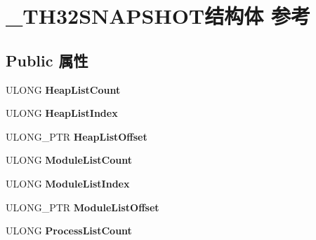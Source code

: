 \hypertarget{struct___t_h32_s_n_a_p_s_h_o_t}{}\section{\+\_\+\+T\+H32\+S\+N\+A\+P\+S\+H\+O\+T结构体 参考}
\label{struct___t_h32_s_n_a_p_s_h_o_t}
\subsection*{Public 属性}
\begin{DoxyCompactItemize}
\item 
\mbox{\label{struct___t_h32_s_n_a_p_s_h_o_t_af9a6c101b92390b093a267cd13b3f395}} 
U\+L\+O\+NG {\bfseries Heap\+List\+Count}
\item 
\mbox{\label{struct___t_h32_s_n_a_p_s_h_o_t_afd4d57ac13cd4161abc173178169b960}} 
U\+L\+O\+NG {\bfseries Heap\+List\+Index}
\item 
\mbox{\label{struct___t_h32_s_n_a_p_s_h_o_t_a611052a97b14711967bfa82222187723}} 
U\+L\+O\+N\+G\+\_\+\+P\+TR {\bfseries Heap\+List\+Offset}
\item 
\mbox{\label{struct___t_h32_s_n_a_p_s_h_o_t_aff867b74c6f826836f6365feeb86c5e3}} 
U\+L\+O\+NG {\bfseries Module\+List\+Count}
\item 
\mbox{\label{struct___t_h32_s_n_a_p_s_h_o_t_aa292a74aaea110b8866bc93f8209d90e}} 
U\+L\+O\+NG {\bfseries Module\+List\+Index}
\item 
\mbox{\label{struct___t_h32_s_n_a_p_s_h_o_t_a5b40b64a5522b8881d648038eca84fa7}} 
U\+L\+O\+N\+G\+\_\+\+P\+TR {\bfseries Module\+List\+Offset}
\item 
\mbox{\label{struct___t_h32_s_n_a_p_s_h_o_t_a1580ed50cfad866cb8810e37dae410e8}} 
U\+L\+O\+NG {\bfseries Process\+List\+Count}
\item 
\mbox{\label{struct___t_h32_s_n_a_p_s_h_o_t_ab46d53b61353d41d14ab9b00ab697432}} 

\end{DoxyCompactItemize}
